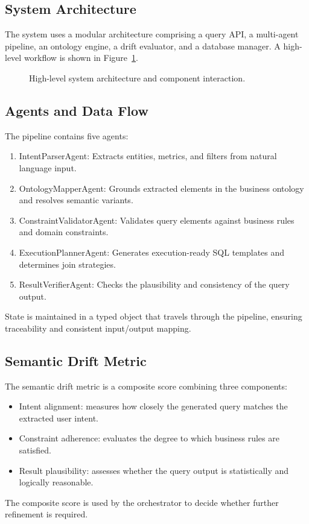 \documentclass[12pt,a4paper]{article}
\begin{document}
\subsection{System Architecture}
The system uses a modular architecture comprising a query API, a multi-agent pipeline, an ontology engine, a drift evaluator, and a database manager. A high-level workflow is shown in Figure~\ref{fig:architecture}.

\begin{figure}[h]
  \centering
  \caption{High-level system architecture and component interaction.}
  \label{fig:architecture}
\end{figure}

\subsection{Agents and Data Flow}
The pipeline contains five agents:
\begin{enumerate}[leftmargin=*]
  \item IntentParserAgent: Extracts entities, metrics, and filters from natural language input.
  \item OntologyMapperAgent: Grounds extracted elements in the business ontology and resolves semantic variants.
  \item ConstraintValidatorAgent: Validates query elements against business rules and domain constraints.
  \item ExecutionPlannerAgent: Generates execution-ready SQL templates and determines join strategies.
  \item ResultVerifierAgent: Checks the plausibility and consistency of the query output.
\end{enumerate}
State is maintained in a typed object that travels through the pipeline, ensuring traceability and consistent input/output mapping.

\subsection{Semantic Drift Metric}
The semantic drift metric is a composite score combining three components:
\begin{itemize}[leftmargin=*]
  \item Intent alignment: measures how closely the generated query matches the extracted user intent.
  \item Constraint adherence: evaluates the degree to which business rules are satisfied.
  \item Result plausibility: assesses whether the query output is statistically and logically reasonable.
\end{itemize}
The composite score is used by the orchestrator to decide whether further refinement is required.
\end{document}
